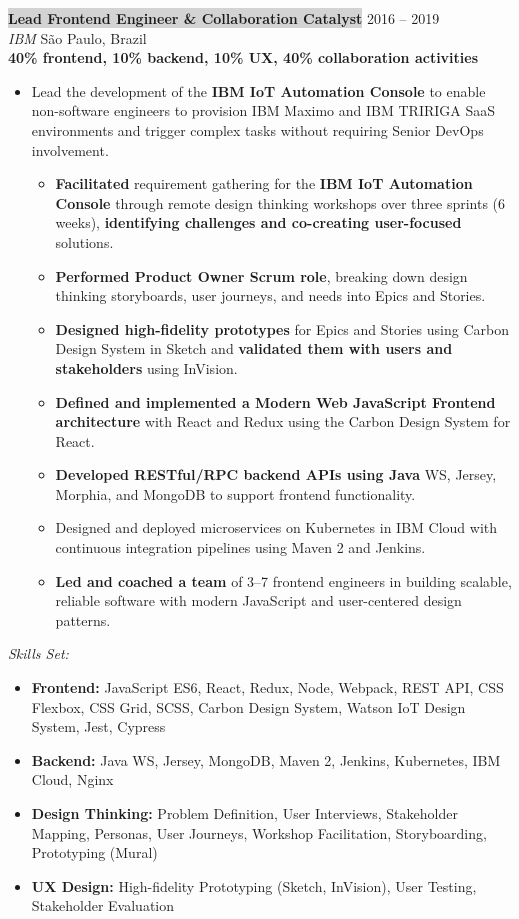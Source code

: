 \documentclass{resume} %
\begin{document}
\colorbox{lightgray}{\textbf{Lead Frontend Engineer \& Collaboration Catalyst}} \hfill 2016 -- 2019\\
\textit{IBM} \hfill São Paulo, Brazil\\
\textbf{40\% frontend, 10\% backend,  10\% UX, 40\% collaboration activities}
\begin{itemize}
    \item  Lead the development of the \textbf{IBM IoT Automation Console} to enable non-software engineers to provision IBM Maximo and IBM TRIRIGA SaaS environments and trigger complex tasks without requiring Senior DevOps involvement. 
        \begin{itemize}
            \item \textbf{Facilitated} requirement gathering for the \textbf{IBM IoT Automation Console} through remote design thinking workshops over three sprints (6 weeks), \textbf{identifying challenges and co-creating user-focused} solutions.            
            \item \textbf{Performed Product Owner Scrum role}, breaking down design thinking storyboards, user journeys, and needs into Epics and Stories.
            \item \textbf{Designed high-fidelity prototypes} for Epics and Stories using Carbon Design System in Sketch and \textbf{validated them with users and stakeholders} using InVision.
            \item \textbf{Defined and implemented a Modern Web JavaScript Frontend architecture} with React and Redux using the Carbon Design System for React.
            \item \textbf{Developed RESTful/RPC backend APIs using Java} WS, Jersey, Morphia, and MongoDB to support frontend functionality.
            \item Designed and deployed microservices on Kubernetes in IBM Cloud with continuous integration pipelines using Maven 2 and Jenkins.
            \item \textbf{Led and coached a team} of 3–7 frontend engineers in building scalable, reliable software with modern JavaScript and user-centered design patterns.
        \end{itemize}      
\end{itemize}

\textit{Skills Set:}
\begin{itemize}
    \item \textbf{Frontend:} JavaScript ES6, React, Redux, Node, Webpack, REST API, CSS Flexbox, CSS Grid, SCSS, Carbon Design System, Watson IoT Design System, Jest, Cypress
    \item \textbf{Backend:} Java WS, Jersey, MongoDB, Maven 2, Jenkins, Kubernetes, IBM Cloud, Nginx
    \item \textbf{Design Thinking:} Problem Definition, User Interviews, Stakeholder Mapping, Personas, User Journeys, Workshop Facilitation, Storyboarding, Prototyping (Mural)
    \item \textbf{UX Design:} High-fidelity Prototyping (Sketch, InVision), User Testing, Stakeholder Evaluation
\end{itemize}
\end{document}
